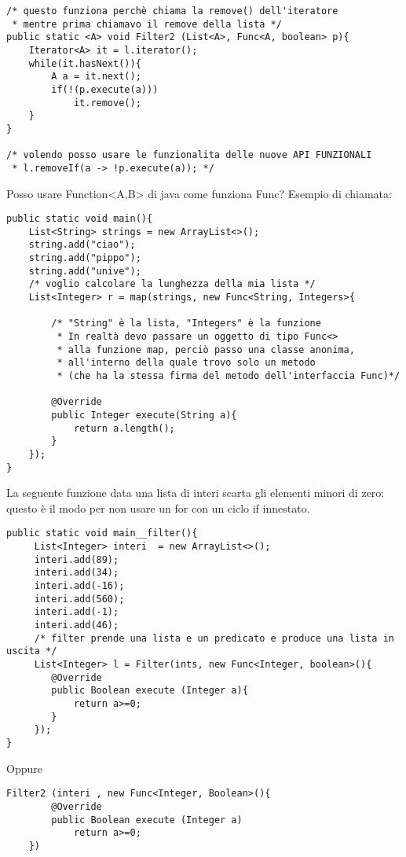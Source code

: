 \begin{lstlisting}[basicstyle=\small,]
/* questo funziona perchè chiama la remove() dell'iteratore
 * mentre prima chiamavo il remove della lista */
public static <A> void Filter2 (List<A>, Func<A, boolean> p){
	Iterator<A> it = l.iterator();
	while(it.hasNext()){
		A a = it.next();
		if(!(p.execute(a)))
			it.remove();
	}
}

/* volendo posso usare le funzionalita delle nuove API FUNZIONALI
 * l.removeIf(a -> !p.execute(a)); */
\end{lstlisting}

\noindent Posso usare Function<A,B> di java come funziona Func? \newline
Esempio di chiamata:

\begin{lstlisting}[basicstyle=\small,]
public static void main(){
	List<String> strings = new ArrayList<>();
	string.add("ciao");
	string.add("pippo");
	string.add("unive");
	/* voglio calcolare la lunghezza della mia lista */
	List<Integer> r = map(strings, new Func<String, Integers>{ 
	
		/* "String" è la lista, "Integers" è la funzione
         * In realtà devo passare un oggetto di tipo Func<>
         * alla funzione map, perciò passo una classe anonima,
         * all'interno della quale trovo solo un metodo
         * (che ha la stessa firma del metodo dell'interfaccia Func)*/
         
		@Override 
		public Integer execute(String a){
			return a.length();
		}	
	});
}
\end{lstlisting}


\noindent La seguente funzione data una lista di interi scarta gli elementi minori di zero: questo è il modo per non usare un for con un ciclo if innestato.

\begin{lstlisting}[basicstyle=\small,]
public static void main__filter(){
	 List<Integer> interi  = new ArrayList<>();
	 interi.add(89);
	 interi.add(34);
	 interi.add(-16);
	 interi.add(560);
	 interi.add(-1);
	 interi.add(46);
	 /* filter prende una lista e un predicato e produce una lista in uscita */
	 List<Integer> l = Filter(ints, new Func<Integer, boolean>(){
	 	@Override
	 	public Boolean execute (Integer a){
	 		return a>=0;
	 	}
	 });
}
\end{lstlisting}

\noindent Oppure 

\begin{lstlisting}[basicstyle=\small,]
	Filter2 (interi , new Func<Integer, Boolean>(){
		@Override
		public Boolean execute (Integer a)
			return a>=0;
	})
\end{lstlisting}

